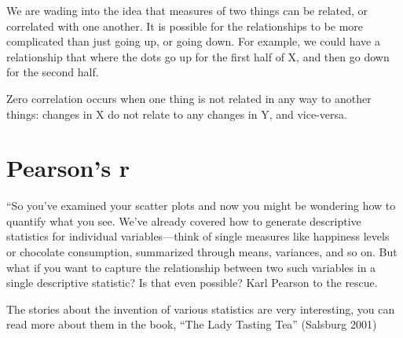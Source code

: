 \documentclass[
  letterpaper,
  DIV=11,
  numbers=noendperiod]{scrreprt}
\begin{document}
\begin{tcolorbox}[enhanced jigsaw, title=\textcolor{quarto-callout-note-color}{\faInfo}\hspace{0.5em}{Note}, colframe=quarto-callout-note-color-frame, colbacktitle=quarto-callout-note-color!10!white, bottomtitle=1mm, leftrule=.75mm, rightrule=.15mm, titlerule=0mm, arc=.35mm, colback=white, opacitybacktitle=0.6, toprule=.15mm, toptitle=1mm, bottomrule=.15mm, coltitle=black, breakable, left=2mm, opacityback=0]

We are wading into the idea that measures of two things can be related,
or correlated with one another. It is possible for the relationships to
be more complicated than just going up, or going down. For example, we
could have a relationship that where the dots go up for the first half
of X, and then go down for the second half.

\end{tcolorbox}

Zero correlation occurs when one thing is not related in any way to
another things: changes in X do not relate to any changes in Y, and
vice-versa.

\section{Pearson's r}\label{pearsons-r}

``So you've examined your scatter plots and now you might be wondering
how to quantify what you see. We've already covered how to generate
descriptive statistics for individual variables---think of single
measures like happiness levels or chocolate consumption, summarized
through means, variances, and so on. But what if you want to capture the
relationship between two such variables in a single descriptive
statistic? Is that even possible? Karl Pearson to the rescue.

\begin{tcolorbox}[enhanced jigsaw, title=\textcolor{quarto-callout-note-color}{\faInfo}\hspace{0.5em}{Note}, colframe=quarto-callout-note-color-frame, colbacktitle=quarto-callout-note-color!10!white, bottomtitle=1mm, leftrule=.75mm, rightrule=.15mm, titlerule=0mm, arc=.35mm, colback=white, opacitybacktitle=0.6, toprule=.15mm, toptitle=1mm, bottomrule=.15mm, coltitle=black, breakable, left=2mm, opacityback=0]

The stories about the invention of various statistics are very
interesting, you can read more about them in the book, ``The Lady
Tasting Tea'' (Salsburg 2001)

\end{tcolorbox}
\end{document}
